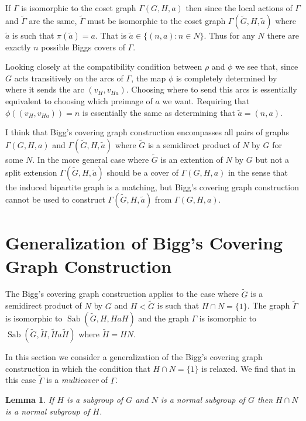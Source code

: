 \documentclass[12pt]{amsart}
\theoremstyle{plain}
\newtheorem{lemma}{Lemma}
\theoremstyle{definition}
\theoremstyle{remark}
\DeclareMathOperator{\sab}{Sab}
\begin{document}
If $\Gamma$ is isomorphic to the coset graph $\Gamma(G, H, a)$
then since the local actions of $\Gamma$ and $\widetilde{\Gamma}$
are the same, $\widetilde{\Gamma}$ must be isomorphic to the coset graph
$\Gamma(\widetilde{G}, H, \widetilde{a})$ where $\widetilde{a}$
is such that $\pi(\widetilde{a}) = a$. That is 
$\widetilde{a} \in \{ (n,a) : n \in N \}$.
Thus for any $N$ there are exactly $n$ possible Biggs covers of $\Gamma$.

Looking closely at the compatibility condition between
$\rho$ and $\phi$ we see that, since $G$ acts transitively
on the arcs of $\Gamma$, the map $\phi$ is completely
determined by where it sends the arc $(v_{H}, v_{Ha})$.
Choosing where to send this arcs is essentially equivalent to
choosing which preimage of $a$ we want.
Requiring that $\phi((v_{H}, v_{Ha})) = n$ is essentially
the same as determining that $\widetilde{a} = (n,a)$.

I think that Bigg's covering graph construction encompasses
all pairs of graphs $\Gamma(G, H, a)$ and $\Gamma(\widetilde{G}, H, \widetilde{a})$
where $\widetilde{G}$ is a semidirect product of $N$ by $G$ for some $N$.
In the more general case where $\widetilde{G}$ is an extention of $N$ by $G$
but not a split extension $\Gamma(\widetilde{G}, H, \widetilde{a})$
should be a cover of $\Gamma(G, H, a)$ in the sense that the induced
bipartite graph is a matching, but Bigg's covering graph construction
cannot be used to construct  $\Gamma(\widetilde{G}, H, \widetilde{a})$
from $\Gamma(G, H, a)$.

\section{Generalization of Bigg's Covering Graph Construction}

The Bigg's covering graph construction applies to the case
where $\widetilde{G}$ is a semidirect product
of $N$ by $G$ and $H < \widetilde{G}$ is such that $H \cap N = \{1\}$.
The graph $\widetilde{\Gamma}$ is isomorphic to 
$\sab(\widetilde{G},H,HaH)$
and the graph $\Gamma$ is isomorphic
to $\sab(\widetilde{G},\widetilde{H},\widetilde{H}a\widetilde{H})$
where $\widetilde{H} = HN$.

In this section we consider a generalization of the 
Bigg's covering graph construction in which the condition
that $H \cap N = \{1\}$ is relaxed.
We find that in this case $\widetilde{\Gamma}$ is a 
{\it multicover} of $\Gamma$.

\begin{lemma}
If $H$ is a subgroup of $G$ and $N$ is a normal subgroup of $G$
then $H \cap N$ is a normal subgroup of $H$.
\end{lemma}
\end{document}
